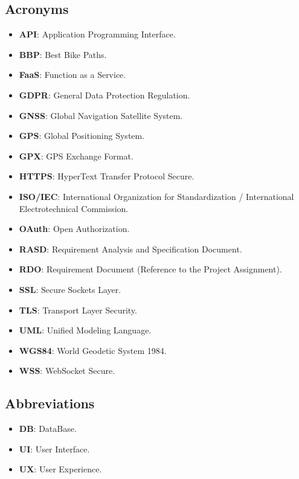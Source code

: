 \subsection{Acronyms}
\begin{itemize}
    \item \textbf{API}: Application Programming Interface.
    \item \textbf{BBP}: Best Bike Paths.
    \item \textbf{FaaS}: Function as a Service.
    \item \textbf{GDPR}: General Data Protection Regulation.
    \item \textbf{GNSS}: Global Navigation Satellite System.
    \item \textbf{GPS}: Global Positioning System.
    \item \textbf{GPX}: GPS Exchange Format.
    \item \textbf{HTTPS}: HyperText Transfer Protocol Secure.
    \item \textbf{ISO/IEC}: International Organization for Standardization / International Electrotechnical Commission.
    \item \textbf{OAuth}: Open Authorization.
    \item \textbf{RASD}: Requirement Analysis and Specification Document.
    \item \textbf{RDO}: Requirement Document (Reference to the Project Assignment).
    \item \textbf{SSL}: Secure Sockets Layer.
    \item \textbf{TLS}: Transport Layer Security.
    \item \textbf{UML}: Unified Modeling Language.
    \item \textbf{WGS84}: World Geodetic System 1984.
    \item \textbf{WSS}: WebSocket Secure.
\end{itemize}

\subsection{Abbreviations}
\begin{itemize}
    \item \textbf{DB}: DataBase.
    \item \textbf{UI}: User Interface.
    \item \textbf{UX}: User Experience.
\end{itemize}
